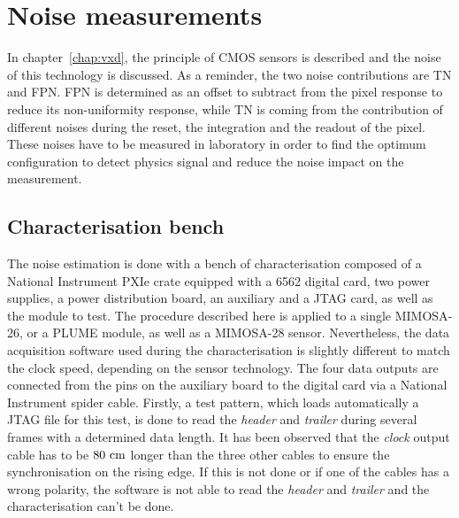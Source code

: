 \section{Noise measurements}
\label{sec:noiseMeasurements}

  In chapter~\ref{chap:vxd}, the principle of \gls{CMOS} sensors is described and the noise of this technology is discussed.
  As a reminder, the two noise contributions are \acrfull{TN} and \acrfull{FPN}.
  \gls{FPN} is determined as an offset to subtract from the pixel response to reduce its non-uniformity response, while \gls{TN} is coming from the contribution of different noises during the reset, the integration and the readout of the pixel.
  These noises have to be measured in laboratory in order to find the optimum configuration to detect physics signal and reduce the noise impact on the measurement.

  \subsection{Characterisation bench}

  The noise estimation is done with a bench of characterisation composed of a National Instrument PXIe crate equipped with a 6562 digital card, two power supplies, a power distribution board, an auxiliary and a \gls{JTAG} card, as well as the module to test.
  The procedure described here is applied to a single \gls{MIMOSA}-26, or a \gls{PLUME} module, as well as a \gls{MIMOSA}-28 sensor.
  Nevertheless, the data acquisition software used during the characterisation is slightly different to match the clock speed, depending on the sensor technology.
  The four data outputs are connected from the pins on the auxiliary board to the digital card via a National Instrument spider cable.
  Firstly, a test pattern, which loads automatically a \gls{JTAG} file for this test, is done to read the \textit{header} and \textit{trailer} during several frames with a determined data length.
  It has been observed that the \textit{clock} output cable has to be $80~\rm{cm}$ longer than the three other cables to ensure the synchronisation on the rising edge.
  If this is not done or if one of the cables has a wrong polarity, the software is not able to read the \textit{header} and \textit{trailer} and the characterisation can't be done.

